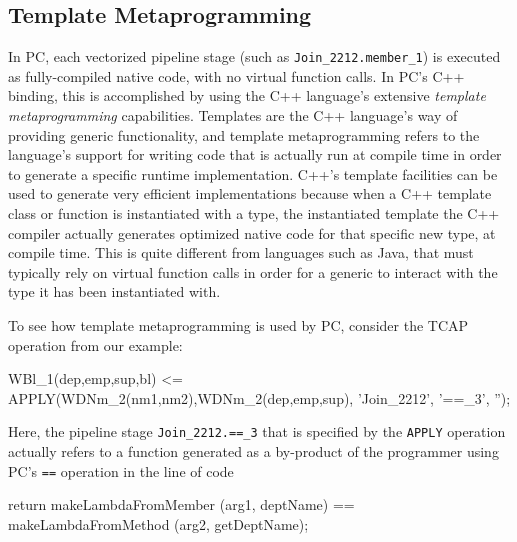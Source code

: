 \subsection{Template Metaprogramming}

In PC,
each vectorized pipeline stage (such as \texttt{Join\_2212.member\_1}) is executed as fully-compiled native code, with no virtual function
calls.
In PC's C++ binding, this is accomplished by using the C++ language's extensive \emph{template metaprogramming} 
capabilities.  Templates are the C++ language's way of providing generic functionality, and template metaprogramming refers
to the language's support for writing code that is actually run at compile time in order to generate a specific
runtime implementation.
C++'s template facilities can be used to generate very efficient implementations because when a C++ template class or
function is instantiated with a type, the instantiated template 
the C++ compiler actually generates optimized native code for that specific new type, at compile time.  
This is quite different from languages
such as Java, that must typically rely on virtual
function calls in order for a generic to interact with the type it has been instantiated with.

To see how template metaprogramming is used by PC, consider
the TCAP operation from our example:

\begin{codesmall}
WBl_1(dep,emp,sup,bl) <= 
   APPLY(WDNm_2(nm1,nm2),WDNm_2(dep,emp,sup), 'Join_2212', '==_3', '');
\end{codesmall}

\noindent
Here, the pipeline stage \texttt{Join\_2212.==\_3} that is specified by the \texttt{APPLY} operation
actually refers to a function generated as a by-product of the
programmer using PC's \texttt{==} operation
in the line of code

\begin{codesmall} 
	return makeLambdaFromMember (arg1, deptName) == 
	       makeLambdaFromMethod (arg2, getDeptName); 
\end{codesmall}

